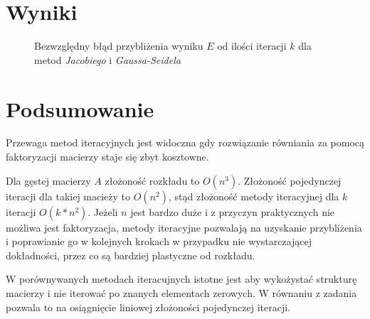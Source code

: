 \documentclass[11pt]{extarticle}
\begin{document}
	\section{Wyniki}
	\begin{figure}[H]
		\begin{center}
			
		\end{center}
		\caption{Bezwzględny błąd przybliżenia wyniku \(E\) od ilości iteracji \(k\) dla metod \textit{Jacobiego} i \textit{Gaussa-Seidela}}
	\end{figure}
	
	\section{Podsumowanie}
	Przewaga metod iteracyjnych jest widoczna gdy rozwiązanie równiania za pomocą faktoryzacji macierzy staje się zbyt kosztowne.
	
	Dla gęstej macierzy \(A\) złożoność rozkładu to \(O(n^3)\). Złożoność pojedynczej iteracji dla takiej macieży to \(O(n^2)\), stąd złożoność metody iteracyjnej dla \(k\) iteracji \(O(k*n^2)\). Jeżeli \(n\) jest bardzo duże i z przyczyn praktycznych nie możliwa jest faktoryzacja, metody iteracyjne pozwalają na uzyskanie przybliżenia i poprawianie go w kolejnych krokach w przypadku nie wystarczającej dokładności, przez co są bardziej plastyczne od rozkładu.

	W porównywanych metodach iteracujnych istotne jest aby wykożystać strukturę macierzy i nie iterować po znanych elementach zerowych. W równaniu z zadania pozwala to na osiągnięcie liniowej złożoności pojedynczej iteracji.
\end{document}
